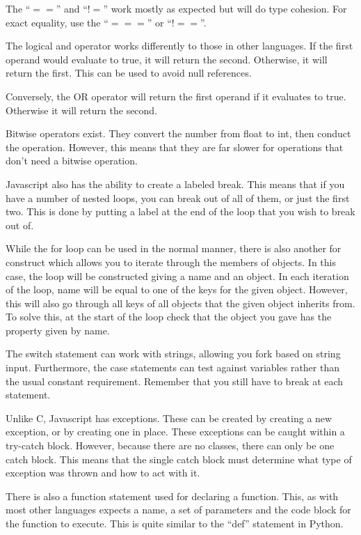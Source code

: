 			The ``$==$'' and ``$!=$'' work mostly as expected but will do type cohesion.
			For exact equality, use the ``$===$'' or ``$!==$''.

			The logical and operator works differently to those in other languages.
			If the first operand would evaluate to true, it will return the second.
			Otherwise, it will return the first.
			This can be used to avoid null references.

			Conversely, the OR operator will return the first operand if it evaluates to true.
			Otherwise it will return the second.

			Bitwise operators exist.
			They convert the number from float to int, then conduct the operation.
			However, this means that they are far slower for operations that don't need a bitwise operation.

			Javascript also has the ability to create a labeled break.
			This means that if you have a number of nested loops, you can break out of all of them, or just the first two.
			This is done by putting a label at the end of the loop that you wish to break out of.

			While the for loop can be used in the normal manner,
			there is also another for construct which allows you to iterate through the members of objects.
			In this case, the loop will be constructed giving a name and an object.
			In each iteration of the loop, name will be equal to one of the keys for the given object.
			However, this will also go through all keys of all objects that the given object inherits from.
			To solve this, at the start of the loop check that the object you gave has the property given by name.

			The switch statement can work with strings, allowing you fork based on string input.
			Furthermore, the case statements can test against variables rather than the usual constant requirement.
			Remember that you still have to break at each statement.

			Unlike C, Javascript has exceptions.
			These can be created by creating a new exception, or by creating one in place.
			These exceptions can be caught within a try-catch block.
			However, because there are no classes, there can only be one catch block.
			This means that the single catch block must determine what type of exception was thrown and how to act with it.

			There is also a function statement used for declaring a function.
			This, as with most other languages expects a name, a set of parameters and the code block for the function to execute.
			This is quite similar to the ``def'' statement in Python.

